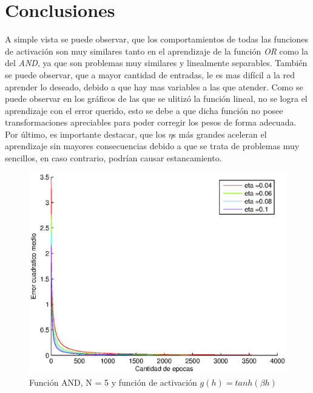 \documentclass{sig-alternate}
\begin{document}
\section*{Conclusiones}
A simple vista se puede observar, que los comportamientos de todas las funciones de activaci\'on son muy similares tanto en el aprendizaje de la funci\'on \textit{OR} como la del \textit{AND}, ya que son problemas muy similares y linealmente separables. Tambi\'en se puede observar, que a mayor cantidad de entradas, le es mas dif\'icil a la red aprender lo deseado, debido a que hay mas variables a las que atender. Como se puede observar en los gr\'aficos de las que se ulitiz\'o la funci\'on lineal, no se logra el aprendizaje con el error querido, esto se debe a que dicha funci\'on no posee transformaciones apreciables para poder corregir los pesos de forma adecuada. Por \'ultimo, es importante destacar, que los $\eta$s m\'as grandes aceleran el aprendizaje sin mayores consecuencias debido a que se trata de problemas muy sencillos, en caso contrario, podr\'ian causar estancamiento.

\begin{figure}[!ht]
	\includegraphics[scale=0.5]{images/PuriAnd/AND_N5_err001_tanh.eps}
  \caption{Funci\'on AND, N = 5 y funci\'on de activaci\'on $g(h) = tanh(\beta h)$}
  \label{fig:tanh}
\end{figure}
\end{document}
